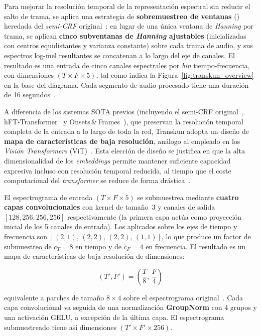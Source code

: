 \documentclass[11pt,spanish,listoffigures,listoftables]{tfgetsinf}
\begin{document}
Para mejorar la resolución temporal de la representación espectral sin reducir el
salto de trama, se aplica una estrategia de \textbf{sobremuestreo de ventanas}
() heredada del \textit{semi-CRF}
original~\cite{yan2021semicrf1}: en lugar de una única ventana de \textit{Hanning} por
trama, se aplican \textbf{cinco subventanas de \textit{Hanning} ajustables} (inicializadas con centros 
equidistantes y varianza constante) sobre cada trama
de audio, y sus espectros log-mel resultantes se concatenan a lo largo del eje de
canales. El resultado es una entrada de cinco canales espectrales por \textit{bin}
tiempo-frecuencia, con dimensiones $(T \times F \times 5)$, tal como indica la
Figura~\ref{fig:transkun_overview} en la base del diagrama. Cada segmento de
audio procesado tiene una duración de 16 segundos~\cite{yan2024transkun}.


A diferencia de los sistemas SOTA previos (incluyendo el semi-CRF
original~\cite{yan2021semicrf1}, hFT-Transformer~\cite{toyama2023hftt} y
Onsets\,\&\,Frames~\cite{hawthorne2018onsetsframes}), que preservan la
resolución temporal completa de la entrada a lo largo de toda la red, Transkun
adopta un diseño de \textbf{mapa de características de baja resolución}, análogo
al empleado en los \textit{Vision Transformers} (ViT)~\cite{dosovitskiy2021vit}. Esta
elección de diseño se justifica en que la alta dimensionalidad de los \textit{embeddings}
permite mantener suficiente capacidad expresiva incluso con resolución temporal
reducida, al tiempo que el coste computacional del \textit{transformer} se reduce de forma
drástica~\cite{yan2024transkun,li2022videt}.

El espectrograma de entrada $(T \times F \times 5)$ se submuestrea mediante
\textbf{cuatro capas convolucionales } con kernel de
tamaño~3 y canales de salida $[128, 256, 256, 256]$ respectivamente (la primera
capa actúa como proyección inicial de los 5 canales de entrada). Los
 aplicados sobre los ejes de tiempo y frecuencia son
$[(2,1),\,(2,2),\,(2,2),\,(1,1)]$, lo que produce un factor de submuestreo de
$c_T = 8$ en tiempo y de $c_F = 4$ en frecuencia. El resultado es un mapa de
características de baja resolución de dimensiones:

\begin{equation}
  (T', F') = \left(\frac{T}{8},\, \frac{F}{4}\right)
  \label{eq:patch_dims}
\end{equation}

\noindent equivalente a parches de tamaño $8 \times 4$ sobre el espectrograma
original~\cite{yan2024transkun}. Cada capa convolucional va seguida de una
normalización \textbf{GroupNorm} con 4 grupos y una activación GELU, a excepción
de la última capa. El espectrograma submuestreado tiene así dimensiones
$(T' \times F' \times 256)$.
\end{document}
